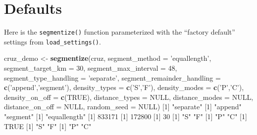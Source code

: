 \documentclass[
]{book}
\newenvironment{Shaded}{\begin{snugshade}}{\end{snugshade}}
\newcommand{\DataTypeTok}[1]{\textcolor[rgb]{0.13,0.29,0.53}{#1}}
\newcommand{\DecValTok}[1]{\textcolor[rgb]{0.00,0.00,0.81}{#1}}
\newcommand{\KeywordTok}[1]{\textcolor[rgb]{0.13,0.29,0.53}{\textbf{#1}}}
\newcommand{\NormalTok}[1]{#1}
\newcommand{\OtherTok}[1]{\textcolor[rgb]{0.56,0.35,0.01}{#1}}
\newcommand{\StringTok}[1]{\textcolor[rgb]{0.31,0.60,0.02}{#1}}
\begin{document}
\hypertarget{defaults-2}{%
\section*{Defaults}\label{defaults-2}}

Here is the \texttt{segmentize()} function parameterized with the ``factory default'' settings from \texttt{load\_settings()}.

\begin{Shaded}
\begin{Highlighting}[]
\NormalTok{cruz_demo <-}\StringTok{ }\KeywordTok{segmentize}\NormalTok{(cruz,}
                        \DataTypeTok{segment_method =} \StringTok{'equallength'}\NormalTok{,}
                        \DataTypeTok{segment_target_km =} \DecValTok{30}\NormalTok{,}
                        \DataTypeTok{segment_max_interval =} \DecValTok{48}\NormalTok{,}
                        \DataTypeTok{segment_type_handling =} \StringTok{'separate'}\NormalTok{,}
                        \DataTypeTok{segment_remainder_handling =} \KeywordTok{c}\NormalTok{(}\StringTok{'append'}\NormalTok{,}\StringTok{'segment'}\NormalTok{),}
                        \DataTypeTok{density_types =} \KeywordTok{c}\NormalTok{(}\StringTok{'S'}\NormalTok{,}\StringTok{'F'}\NormalTok{),}
                        \DataTypeTok{density_modes =} \KeywordTok{c}\NormalTok{(}\StringTok{'P'}\NormalTok{,}\StringTok{'C'}\NormalTok{),}
                        \DataTypeTok{density_on_off =} \KeywordTok{c}\NormalTok{(}\OtherTok{TRUE}\NormalTok{),}
                        \DataTypeTok{distance_types =} \OtherTok{NULL}\NormalTok{,}
                        \DataTypeTok{distance_modes =} \OtherTok{NULL}\NormalTok{,}
                        \DataTypeTok{distance_on_off =} \OtherTok{NULL}\NormalTok{,}
                        \DataTypeTok{random_seed =} \OtherTok{NULL}\NormalTok{)}
\NormalTok{[}\DecValTok{1}\NormalTok{] }\StringTok{"separate"}
\NormalTok{[}\DecValTok{1}\NormalTok{] }\StringTok{"append"}  \StringTok{"segment"}
\NormalTok{[}\DecValTok{1}\NormalTok{] }\StringTok{"equallength"}
\NormalTok{[}\DecValTok{1}\NormalTok{] }\DecValTok{833171}
\NormalTok{[}\DecValTok{1}\NormalTok{] }\DecValTok{172800}
\NormalTok{[}\DecValTok{1}\NormalTok{] }\DecValTok{30}
\NormalTok{[}\DecValTok{1}\NormalTok{] }\StringTok{"S"} \StringTok{"F"}
\NormalTok{[}\DecValTok{1}\NormalTok{] }\StringTok{"P"} \StringTok{"C"}
\NormalTok{[}\DecValTok{1}\NormalTok{] }\OtherTok{TRUE}
\NormalTok{[}\DecValTok{1}\NormalTok{] }\StringTok{"S"} \StringTok{"F"}
\NormalTok{[}\DecValTok{1}\NormalTok{] }\StringTok{"P"} \StringTok{"C"}

\end{Highlighting}
\end{Shaded}
\end{document}
